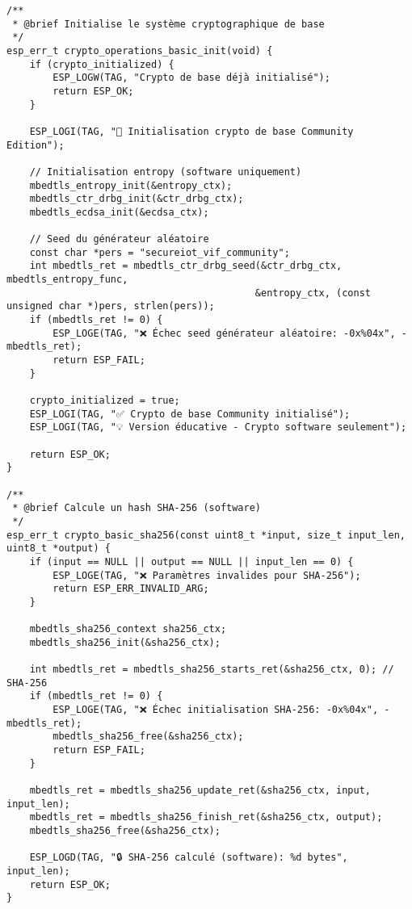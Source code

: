 \begin{lstlisting}[caption={Opérations cryptographiques de base}]
/**
 * @brief Initialise le système cryptographique de base
 */
esp_err_t crypto_operations_basic_init(void) {
    if (crypto_initialized) {
        ESP_LOGW(TAG, "Crypto de base déjà initialisé");
        return ESP_OK;
    }
    
    ESP_LOGI(TAG, "🔐 Initialisation crypto de base Community Edition");
    
    // Initialisation entropy (software uniquement)
    mbedtls_entropy_init(&entropy_ctx);
    mbedtls_ctr_drbg_init(&ctr_drbg_ctx);
    mbedtls_ecdsa_init(&ecdsa_ctx);
    
    // Seed du générateur aléatoire
    const char *pers = "secureiot_vif_community";
    int mbedtls_ret = mbedtls_ctr_drbg_seed(&ctr_drbg_ctx, mbedtls_entropy_func, 
                                           &entropy_ctx, (const unsigned char *)pers, strlen(pers));
    if (mbedtls_ret != 0) {
        ESP_LOGE(TAG, "❌ Échec seed générateur aléatoire: -0x%04x", -mbedtls_ret);
        return ESP_FAIL;
    }
    
    crypto_initialized = true;
    ESP_LOGI(TAG, "✅ Crypto de base Community initialisé");
    ESP_LOGI(TAG, "💡 Version éducative - Crypto software seulement");
    
    return ESP_OK;
}

/**
 * @brief Calcule un hash SHA-256 (software)
 */
esp_err_t crypto_basic_sha256(const uint8_t *input, size_t input_len, uint8_t *output) {
    if (input == NULL || output == NULL || input_len == 0) {
        ESP_LOGE(TAG, "❌ Paramètres invalides pour SHA-256");
        return ESP_ERR_INVALID_ARG;
    }
    
    mbedtls_sha256_context sha256_ctx;
    mbedtls_sha256_init(&sha256_ctx);
    
    int mbedtls_ret = mbedtls_sha256_starts_ret(&sha256_ctx, 0); // SHA-256
    if (mbedtls_ret != 0) {
        ESP_LOGE(TAG, "❌ Échec initialisation SHA-256: -0x%04x", -mbedtls_ret);
        mbedtls_sha256_free(&sha256_ctx);
        return ESP_FAIL;
    }
    
    mbedtls_ret = mbedtls_sha256_update_ret(&sha256_ctx, input, input_len);
    mbedtls_ret = mbedtls_sha256_finish_ret(&sha256_ctx, output);
    mbedtls_sha256_free(&sha256_ctx);
    
    ESP_LOGD(TAG, "🔒 SHA-256 calculé (software): %d bytes", input_len);
    return ESP_OK;
}
\end{lstlisting}


